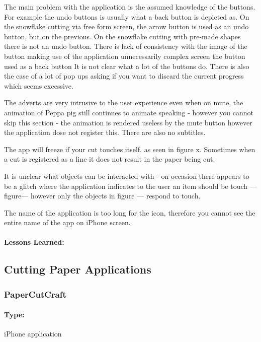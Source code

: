 \documentclass[11pt]{article}
\begin{document}
                
                The main problem with the application is the assumed knowledge of the buttons. For example the undo buttons is usually what a back button is depicted as. On the snowflake cutting via free form screen, the arrow button is used as an undo button, but on the previous. On the snowflake cutting with pre-made shapes there is not an undo button. There is lack of consistency with the image of the button making use of the application unnecessarily complex screen the button used as a back button It is not clear what a lot of the buttons do. There is also the case of a lot of pop ups asking if you want to discard the current progress which seems excessive. 
                
                The adverts are very intrusive to the user experience even when on mute, the animation of Peppa pig still continues to animate speaking - however you cannot skip this section - the animation is rendered useless by the mute button however the application dose not register this. There are also no subtitles.
                
                The app will freeze if your cut touches itself. as seen in figure x. Sometimes when a cut is registered as a line it does not result in the paper being cut. 
                
                It is unclear what objects can be interacted with - on occasion there appears to be a glitch where the application indicates to the user an item should be touch --- figure--- however only the objects in figure --- respond to touch. 
                
                The name of the application is too long for the icon, therefore you cannot see the entire name of the app on iPhone screen. 
                
                \paragraph{Lessons Learned:}   
                
        \subsection{Cutting Paper Applications}
            \subsubsection{PaperCutCraft}
            
                \paragraph{Type:} iPhone application 
                 
\end{document}

